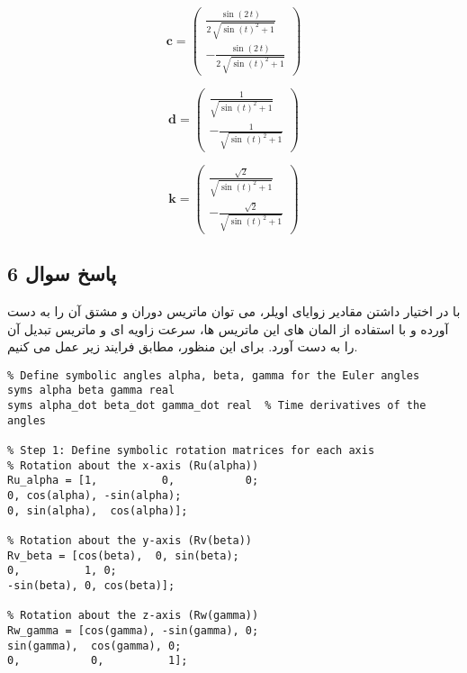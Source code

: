 \[
\mathbf{c} = \left(
\begin{array}{c}
	\frac{\sin \left(2\,t\right)}{2\,\sqrt{{\sin \left(t\right)}^2 + 1}} \\
	-\frac{\sin \left(2\,t\right)}{2\,\sqrt{{\sin \left(t\right)}^2 + 1}}
\end{array}
\right)
\]

\[
\mathbf{d} = \left(
\begin{array}{c}
	\frac{1}{\sqrt{{\sin \left(t\right)}^2 + 1}} \\
	-\frac{1}{\sqrt{{\sin \left(t\right)}^2 + 1}}
\end{array}
\right)
\]

\[
\mathbf{k} = \left(
\begin{array}{c}
	\frac{\sqrt{2}}{\sqrt{{\sin \left(t\right)}^2 + 1}} \\
	-\frac{\sqrt{2}}{\sqrt{{\sin \left(t\right)}^2 + 1}}
\end{array}
\right)
\]






\subsection{ پاسخ سوال 6}

با در اختیار داشتن مقادیر زوایای اویلر، می توان ماتریس دوران و مشتق آن را به دست آورده و با استفاده از المان های این ماتریس ها، سرعت زاویه ای و ماتریس تبدیل آن را به دست آورد. برای این منظور، مطابق فرایند زیر عمل می کنیم.

\begin{latin}
	\begin{lstlisting}[frame=single,style=Matlab-Pyglike]
%% Section 1: Define the Euler Angles and Rotation Matrices for UVW
% Define symbolic angles alpha, beta, gamma for the Euler angles
syms alpha beta gamma real
syms alpha_dot beta_dot gamma_dot real  % Time derivatives of the angles

% Step 1: Define symbolic rotation matrices for each axis
% Rotation about the x-axis (Ru(alpha))
Ru_alpha = [1,          0,           0;
0, cos(alpha), -sin(alpha);
0, sin(alpha),  cos(alpha)];

% Rotation about the y-axis (Rv(beta))
Rv_beta = [cos(beta),  0, sin(beta);
0,          1, 0;
-sin(beta), 0, cos(beta)];

% Rotation about the z-axis (Rw(gamma))
Rw_gamma = [cos(gamma), -sin(gamma), 0;
sin(gamma),  cos(gamma), 0;
0,           0,          1];
		
	\end{lstlisting}
\end{latin}

